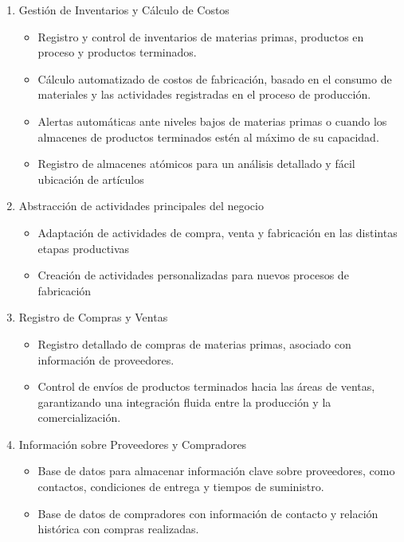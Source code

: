 \begin{enumerate}
  \item Gestión de Inventarios y Cálculo de Costos
        \begin{itemize}
          \item Registro y control de inventarios de materias primas, productos en proceso y productos terminados.
          \item Cálculo automatizado de costos de fabricación, basado en el consumo de materiales y las actividades registradas en el proceso de producción.
          \item Alertas automáticas ante niveles bajos de materias primas o cuando los almacenes de productos terminados estén al máximo de su capacidad.
          \item Registro de almacenes atómicos para un análisis detallado y fácil ubicación de artículos 
        \end{itemize}
        
  \item Abstracción de actividades principales del negocio
        \begin{itemize}
          \item Adaptación de actividades de compra, venta y fabricación en las distintas etapas productivas
          \item Creación de actividades personalizadas para nuevos procesos de fabricación
        \end{itemize}

  \item Registro de Compras y Ventas
        \begin{itemize}
          \item Registro detallado de compras de materias primas, asociado con información de proveedores.
          \item Control de envíos de productos terminados hacia las áreas de ventas, garantizando una integración fluida entre la producción y la comercialización.
        \end{itemize}

  \item Información sobre Proveedores y Compradores
        \begin{itemize}
          \item Base de datos para almacenar información clave sobre proveedores, como contactos, condiciones de entrega y tiempos de suministro.
          \item Base de datos de compradores con información de contacto y relación histórica con compras realizadas.
        \end{itemize}


\end{enumerate}
